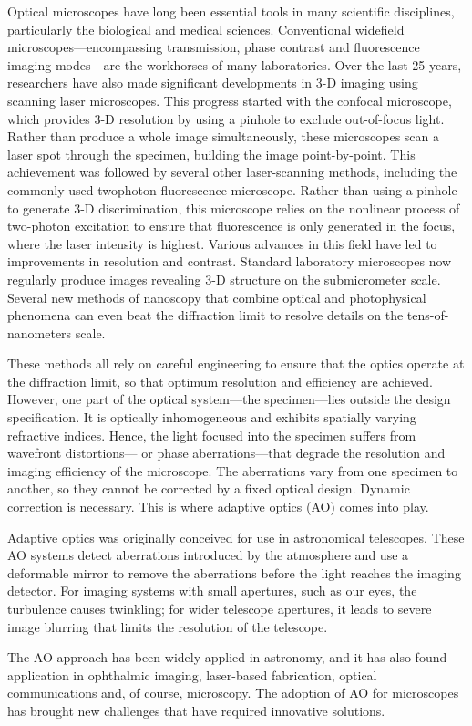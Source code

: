 \cite{Aberrations_book} 

Optical microscopes have long been essential tools in many scientific disciplines, particularly the biological and medical sciences. Conventional widefield microscopes—encompassing transmission, phase contrast and fluorescence imaging modes—are the workhorses of many laboratories. Over the last 25 years, researchers have also made significant developments in 3-D imaging using scanning laser microscopes. This progress started with the confocal microscope, which provides 3-D resolution by using a pinhole to exclude out-of-focus light. Rather than produce a whole image simultaneously, these microscopes scan a laser spot through the specimen, building the image point-by-point. This achievement was followed by several other laser-scanning methods, including the commonly used twophoton fluorescence microscope. Rather than using a pinhole to generate 3-D discrimination, this microscope relies on the nonlinear process of two-photon excitation to ensure that fluorescence is only generated in the focus, where the laser intensity is highest. Various advances in this field have led to improvements in resolution and contrast. Standard laboratory microscopes now regularly produce images revealing 3-D structure on the submicrometer scale. Several new methods of nanoscopy that combine optical and photophysical phenomena can even beat the diffraction limit to resolve details on the tens-of-nanometers scale.
 
These methods all rely on careful engineering to ensure that the optics operate at the diffraction limit, so that optimum resolution and efficiency are achieved. However, one part of the optical system—the specimen—lies outside the design specification. It is optically inhomogeneous and exhibits spatially varying refractive indices. Hence, the light focused into the specimen suffers from wavefront distortions— or phase aberrations—that degrade the resolution and imaging efficiency of the microscope. The aberrations vary from one specimen to another, so they cannot be corrected by a fixed optical design. Dynamic correction is necessary. This is where adaptive optics (AO) comes into play. 

Adaptive optics was originally conceived for use in astronomical telescopes. These AO systems detect aberrations introduced by the atmosphere and use a deformable mirror to remove the aberrations before the light reaches the imaging detector. For imaging systems with small apertures, such as our eyes, the turbulence causes twinkling; for wider telescope apertures, it leads to severe image blurring that limits the resolution of the telescope. 

The AO approach has been widely applied in astronomy, and it has also found application in ophthalmic imaging, laser-based fabrication, optical communications and, of course, microscopy. The adoption of AO for microscopes has brought new challenges that have required innovative solutions.

\cite{adaptive_optics_bio_microscope}
